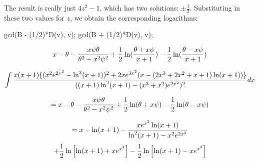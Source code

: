 The result is really just $4z^2-1$,
which has two solutions: $\pm\frac{1}{2}$.  Substituting in these two
values for $z$, we obtain the corresponding logarithms:

\begin{maximacode}
gcd(B - (1/2)*D(v), v);
gcd(B + (1/2)*D(v), v);
\end{maximacode}


{\LARGE$$x - \theta - {x\psi\theta\over{\theta^2-x^2\psi^2}} + {1\over2}\ln({{\theta + x \psi}\over{x+1}}) - {1\over2}\ln({{\theta - x \psi}\over{x+1}})$$}


$$\int{{x(x+1)\{(x^2e^{2x^2}-\ln^2(x+1))^2+2xe^{3x^2}(x-(2x^3+2x^2+x+1)\ln(x+1))\}}\over{((x+1)\ln^2(x+1) - (x^3+x^2)e^{2x^2})^2}} dx$$

{\LARGE$$= x - \theta - {x\psi\theta\over{\theta^2-x^2\psi^2}} + {1\over2}\ln(\theta + x \psi) - {1\over2}\ln(\theta - x \psi)$$}

$$= x - \ln(x+1) - {x e^{x^2}\ln(x+1)\over{\ln^2(x+1)-x^2 e^{2x^2}}}$$
$$+ {1\over2}\ln\left[\ln(x+1) + x e^{x^2}\right] - {1\over2}\ln\left[\ln(x+1) - x e^{x^2}\right]$$

\endexample
